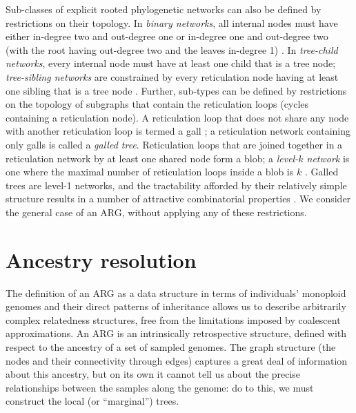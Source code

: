 \documentclass{article}
\begin{document}
Sub-classes of explicit rooted phylogenetic networks can also be defined by restrictions on their topology.
In \emph{binary networks}, all internal nodes must have either in-degree two and out-degree one or in-degree
one and out-degree two (with the root having out-degree two and the leaves in-degree 1) \citep{steel2016phylogeny}.
In \emph{tree-child networks}, every internal node must have at least one child that is a tree node;
\emph{tree-sibling networks} are constrained by every reticulation node having at least one sibling that is a
tree node \citep{cardona2008extended}. Further, sub-types can be defined by restrictions on
the topology of subgraphs that contain the reticulation loops (cycles containing a reticulation node).
A reticulation loop that does not share any node with another reticulation loop is termed a gall
\citep[][p.\ 237]{gusfield2014recombinatorics}; a reticulation network containing only galls is
called a \emph{galled tree}. Reticulation loops that are joined together in a reticulation network
by at least one shared node form a blob; a \emph{level-$k$ network} is one where the maximal number
of reticulation loops inside a blob is $k$ \citep{choy2005computing}. Galled trees are level-1 networks,
and the tractability afforded by their relatively simple structure results in a number of attractive
combinatorial properties \citep{wang2001perfect, gusfield2004optimal}. We consider the general case of
an ARG, without applying any of these restrictions.



\section*{Ancestry resolution}
The definition of an ARG as a data structure in terms of
individuals' monoploid genomes
and their direct patterns of inheritance allows us to describe arbitrarily
complex relatedness structures, free from the limitations imposed by
coalescent approximations.
An ARG is an intrinsically retrospective
structure, defined with respect to the ancestry of
a set of sampled genomes.
The graph structure (the nodes and their connectivity through edges)
captures a great deal of information about this ancestry,
but on its own it cannot tell us about the precise relationships between
the samples along the genome: do to this, we must construct the
local (or ``marginal'') trees.
\end{document}

